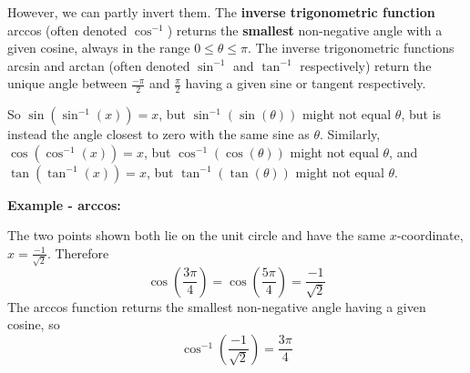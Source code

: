 \documentclass{article}
\begin{document}
However, we can partly invert them. The \textbf{inverse trigonometric function} arccos (often denoted $\cos^{-1}$) returns the \textbf{smallest} non-negative angle with a given cosine, always in the range $0\leq\theta\leq\pi$. The inverse trigonometric functions arcsin and arctan (often denoted $\sin^{-1}$ and $\tan^{-1}$ respectively) return the unique angle between $\frac{-\pi}{2}$ and $\frac{\pi}{2}$ having a given sine or tangent respectively.

So $\sin(\sin^{-1}(x))=x$, but $\sin^{-1}(\sin(\theta))$ might not equal $\theta$, but is instead the angle closest to zero with the same sine as $\theta$. Similarly, $\cos(\cos^{-1}(x))=x$, but $\cos^{-1}(\cos(\theta))$ might not equal $\theta$, and $\tan(\tan^{-1}(x))=x$, but $\tan^{-1}(\tan(\theta))$ might not equal $\theta$.

\clearpage


\textbf{Example - arccos:}

\begin{center}
\end{center}


The two points shown both lie on the unit circle and have the same $x$-coordinate, $x=\frac{-1}{\sqrt{2}}$. Therefore
\[\cos\left(\frac{3\pi}{4}\right)=\cos\left(\frac{5\pi}{4}\right)=\frac{-1}{\sqrt{2}}\]
The arccos function returns the smallest non-negative angle having a given cosine, so
\[\cos^{-1}\left(\frac{-1}{\sqrt{2}}\right)=\frac{3\pi}{4}\]
\end{document}
